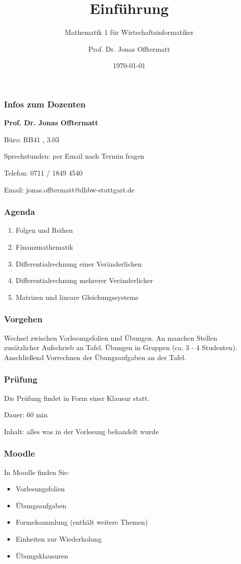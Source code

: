 \documentclass{beamer}
\title{Einführung}
\subtitle{Mathematik 1 für Wirtschaftsinformatiker}
\author{Prof. Dr. Jonas Offtermatt}
\date{\today}
\begin{document}
\begin{frame}
    \frametitle{Infos zum Dozenten}

    \textbf{Prof. Dr. Jonas Offtermatt}
    
    Büro: RB41 , 3.03

    Sprechstunden: per Email nach Termin fragen

    Telefon: 0711 / 1849 4540
    
    Email: jonas.offtermatt@dhbw-stuttgart.de

\end{frame}

\begin{frame}
    \frametitle{Agenda}
    \begin{enumerate}
        \item Folgen und Reihen
        \item Finanzmathematik
        \item Differentialrechnung einer Veränderlichen
        \item Differentialrechnung mehrerer Veränderlicher
        \item Matrizen und lineare Gleichungssysteme
    \end{enumerate}

\end{frame}

\begin{frame}
    \frametitle{Vorgehen}
    Wechsel zwischen Vorlesungsfolien und Übungen. An manchen Stellen zusätzlicher Aufschrieb an Tafel.
    \newline
    Übungen in Gruppen (ca. 3 - 4 Studenten). Anschließend Vorrechnen der Übungsaufgaben an der Tafel. 


\end{frame}

\begin{frame}
    \frametitle{Prüfung}
    Die Prüfung findet in Form einer Klausur statt.
    \newline

    Dauer: 60 min 
    \newline

    Inhalt: alles was in der Vorlesung behandelt wurde

\end{frame}

\begin{frame}
    \frametitle{Moodle}
    In Moodle finden Sie: 
    \begin{itemize}
        \item Vorlesungsfolien
        \item Übungsaufgaben
        \item Formelsammlung (enthält weitere Themen)
        \item Einheiten zur Wiederholung
        \item Übungsklausuren
    \end{itemize}
\end{frame}
\end{document}
